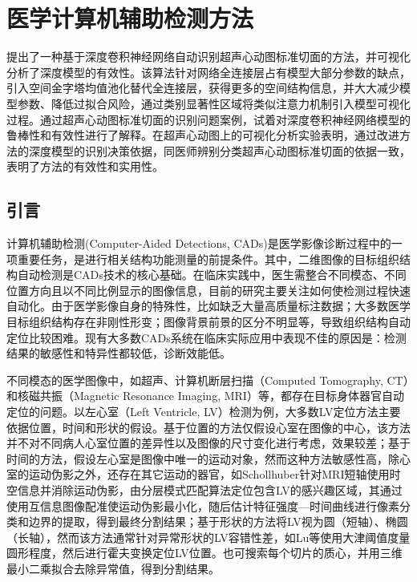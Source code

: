\chapter{医学计算机辅助检测方法}
\label{chap:Detection}

 提出了一种基于深度卷积神经网络自动识别超声心动图标准切面的方法，并可视化分析了深度模型的有效性。该算法针对网络全连接层占有模型大部分参数的缺点，引入空间金字塔均值池化替代全连接层，获得更多的空间结构信息，并大大减少模型参数、降低过拟合风险，通过类别显著性区域将类似注意力机制引入模型可视化过程。通过超声心动图标准切面的识别问题案例，试着对深度卷积神经网络模型的鲁棒性和有效性进行了解释。在超声心动图上的可视化分析实验表明，通过改进方法的深度模型的识别决策依据，同医师辨别分类超声心动图标准切面的依据一致，表明了方法的有效性和实用性。

\section{引言}

计算机辅助检测(Computer-Aided Detections, CADs)是医学影像诊断过程中的一项重要任务，是进行相关结构功能测量的前提条件。其中，二维图像的目标组织结构自动检测是CADs技术的核心基础。在临床实践中，医生需整合不同模态、不同位置方向且以不同比例显示的图像信息，目前的研究主要关注如何使检测过程快速自动化。由于医学影像自身的特殊性，比如缺乏大量高质量标注数据；大多数医学目标组织结构存在非刚性形变；图像背景前景的区分不明显等，导致组织结构自动定位比较困难。现有大多数CADs系统在临床实际应用中表现不佳的原因是：检测结果的敏感性和特异性都较低，诊断效能低\citep{Cheng2016a}。


不同模态的医学图像中，如超声、计算机断层扫描（Computed Tomography, CT）和核磁共振（Magnetic Resonance Imaging, MRI）等，都存在目标身体器官自动定位的问题。以左心室（Left Ventricle, LV）检测为例，大多数LV定位方法主要依据位置，时间和形状的假设。基于位置的方法仅假设心室在图像的中心，该方法并不对不同病人心室位置的差异性以及图像的尺寸变化进行考虑，效果较差；基于时间的方法，假设左心室是图像中唯一的运动对象，然而这种方法敏感性高，除心室的运动伪影之外，还存在其它运动的器官，如Schollhuber\citep{Schollhuber2008}针对MRI短轴使用时空信息并消除运动伪影，由分层模式匹配算法定位包含LV的感兴趣区域，其通过使用互信息图像配准使运动伪影最小化，随后估计特征强度—时间曲线进行像素分类和边界的提取，得到最终分割结果；基于形状的方法将LV视为圆（短轴）、椭圆（长轴），然而该方法通常针对异常形状的LV容错性差，如Lu等\citep{Lu2009}使用大津阈值度量圆形程度，然后进行霍夫变换定位LV位置。也可搜索每个切片的质心，并用三维最小二乘拟合去除异常值，得到分割结果\citep{Petitjean2011}。


